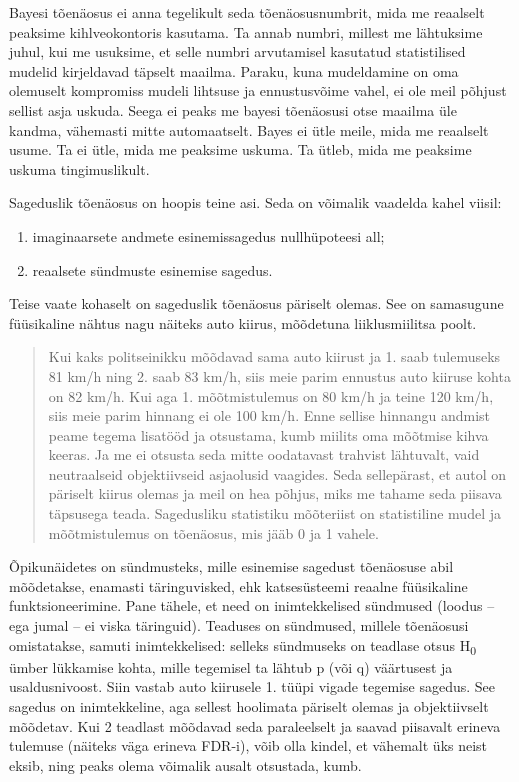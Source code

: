 \documentclass[]{book}
\begin{document}
Bayesi tõenäosus ei anna tegelikult seda tõenäosusnumbrit, mida me
reaalselt peaksime kihlveokontoris kasutama. Ta annab numbri, millest me
lähtuksime juhul, kui me usuksime, et selle numbri arvutamisel kasutatud
statistilised mudelid kirjeldavad täpselt maailma. Paraku, kuna
mudeldamine on oma olemuselt kompromiss mudeli lihtsuse ja ennustusvõime
vahel, ei ole meil põhjust sellist asja uskuda. Seega ei peaks me bayesi
tõenäosusi otse maailma üle kandma, vähemasti mitte automaatselt. Bayes
ei ütle meile, mida me reaalselt usume. Ta ei ütle, mida me peaksime
uskuma. Ta ütleb, mida me peaksime uskuma tingimuslikult.

Sageduslik tõenäosus on hoopis teine asi. Seda on võimalik vaadelda
kahel viisil:

\begin{enumerate}
\def\labelenumi{\arabic{enumi}.}
\item
  imaginaarsete andmete esinemissagedus nullhüpoteesi all;
\item
  reaalsete sündmuste esinemise sagedus.
\end{enumerate}

Teise vaate kohaselt on sageduslik tõenäosus päriselt olemas. See on
samasugune füüsikaline nähtus nagu näiteks auto kiirus, mõõdetuna
liiklusmiilitsa poolt.

\begin{quote}
Kui kaks politseinikku mõõdavad sama auto kiirust ja 1. saab tulemuseks
81 km/h ning 2. saab 83 km/h, siis meie parim ennustus auto kiiruse
kohta on 82 km/h. Kui aga 1. mõõtmistulemus on 80 km/h ja teine 120
km/h, siis meie parim hinnang ei ole 100 km/h. Enne sellise hinnangu
andmist peame tegema lisatööd ja otsustama, kumb miilits oma mõõtmise
kihva keeras. Ja me ei otsusta seda mitte oodatavast trahvist lähtuvalt,
vaid neutraalseid objektiivseid asjaolusid vaagides. Seda sellepärast,
et autol on päriselt kiirus olemas ja meil on hea põhjus, miks me tahame
seda piisava täpsusega teada. Sagedusliku statistiku mõõteriist on
statistiline mudel ja mõõtmistulemus on tõenäosus, mis jääb 0 ja 1
vahele.
\end{quote}

Õpikunäidetes on sündmusteks, mille esinemise sagedust tõenäosuse abil
mõõdetakse, enamasti täringuvisked, ehk katsesüsteemi reaalne
füüsikaline funktsioneerimine. Pane tähele, et need on inimtekkelised
sündmused (loodus -- ega jumal -- ei viska täringuid). Teaduses on
sündmused, millele tõenäosusi omistatakse, samuti inimtekkelised:
selleks sündmuseks on teadlase otsus H\textsubscript{0} ümber lükkamise
kohta, mille tegemisel ta lähtub p (või q) väärtusest ja usaldusnivoost.
Siin vastab auto kiirusele 1. tüüpi vigade tegemise sagedus. See sagedus
on inimtekkeline, aga sellest hoolimata päriselt olemas ja objektiivselt
mõõdetav. Kui 2 teadlast mõõdavad seda paraleelselt ja saavad piisavalt
erineva tulemuse (näiteks väga erineva FDR-i), võib olla kindel, et
vähemalt üks neist eksib, ning peaks olema võimalik ausalt otsustada,
kumb.
\end{document}
